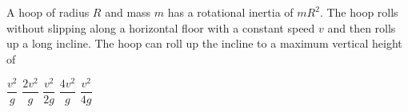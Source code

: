\documentclass{../../oss-apphys-exam}
\begin{document}



\raggedcolumns
\begin{multicols*}{2}
  \begin{questions}
    
    \question A hoop of radius $R$ and mass $m$ has a rotational inertia of
    $mR^2$. The hoop rolls without slipping along a horizontal floor with a
    constant speed $v$ and then rolls up a long incline. The hoop can roll
    up the incline to a maximum vertical height of
    \begin{center}
    \end{center}
    \begin{choices}
      \choice$\dfrac{v^2}g$
      \choice$\dfrac{2v^2}{g}$
      \choice$\dfrac{v^2}{2g}$
      \choice$\dfrac{4v^2}{g}$
      \choice$\dfrac{v^2}{4g}$
    \end{choices}
    

\end{questions}
\end{multicols*}
\end{document}
